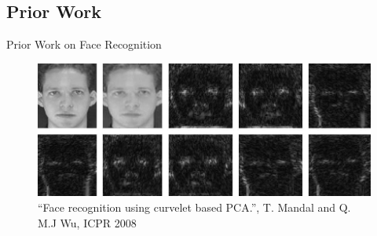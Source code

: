 \documentclass[mathserif]{beamer}
\begin{document}

\subsection{Prior Work}
\begin{frame}{Prior Work on Face Recognition}
    \begin{figure}
        \includegraphics[width=.9\textwidth]{illustrations/related_work/curvelet_faces_mandal09}
        \caption{``Face recognition using curvelet based PCA.'', T. Mandal and Q. M.J Wu, ICPR 2008}
    \end{figure}
\end{frame}
\end{document}
